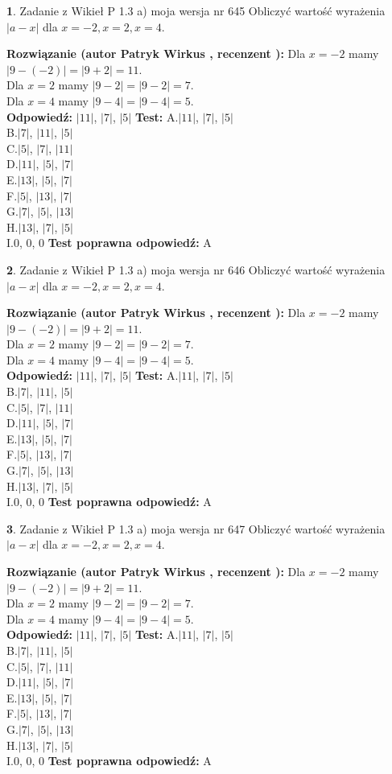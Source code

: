 \documentclass[12pt, a4paper]{article}
\theoremstyle{definition} %
\newtheorem{zad}{}
\newcommand{\zadStart}[1]{\begin{zad}#1\newline}
\newcommand{\zadStop}{\end{zad}}
\newcommand{\rozwStart}[2]{\noindent \textbf{Rozwiązanie (autor #1 , recenzent #2): }\newline}
\newcommand{\rozwStop}{\newline}
\newcommand{\odpStart}{\noindent \textbf{Odpowiedź:}\newline}
\newcommand{\odpStop}{\newline}
\newcommand{\testStart}{\noindent \textbf{Test:}\newline}
\newcommand{\testStop}{\newline}
\newcommand{\kluczStart}{\noindent \textbf{Test poprawna odpowiedź:}\newline}
\newcommand{\kluczStop}{\newline}
\begin{document}
\zadStart{Zadanie z Wikieł P 1.3 a) moja wersja nr 645}
Obliczyć wartość wyrażenia $|a - x|$ dla $x=-2,x=2,x=4$.
\zadStop
\rozwStart{Patryk Wirkus}{}
Dla $x = -2$ mamy $|9 - (-2)| = |9 + 2| = 11$.\\
Dla $x = 2$ mamy $|9 - 2| = |9 - 2| = 7$.\\
Dla $x = 4$ mamy $|9 - 4| = |9 - 4| = 5$.\\
\rozwStop
\odpStart
$|11|$, $|7|$, $|5|$
\odpStop
\testStart
A.$|11|$, $|7|$, $|5|$\\
B.$|7|$, $|11|$, $|5|$\\
C.$|5|$, $|7|$, $|11|$\\
D.$|11|$, $|5|$, $|7|$\\
E.$|13|$, $|5|$, $|7|$\\
F.$|5|$, $|13|$, $|7|$\\
G.$|7|$, $|5|$, $|13|$\\
H.$|13|$, $|7|$, $|5|$\\
I.$0$, $0$, $0$
\testStop
\kluczStart
A
\kluczStop



\zadStart{Zadanie z Wikieł P 1.3 a) moja wersja nr 646}
Obliczyć wartość wyrażenia $|a - x|$ dla $x=-2,x=2,x=4$.
\zadStop
\rozwStart{Patryk Wirkus}{}
Dla $x = -2$ mamy $|9 - (-2)| = |9 + 2| = 11$.\\
Dla $x = 2$ mamy $|9 - 2| = |9 - 2| = 7$.\\
Dla $x = 4$ mamy $|9 - 4| = |9 - 4| = 5$.\\
\rozwStop
\odpStart
$|11|$, $|7|$, $|5|$
\odpStop
\testStart
A.$|11|$, $|7|$, $|5|$\\
B.$|7|$, $|11|$, $|5|$\\
C.$|5|$, $|7|$, $|11|$\\
D.$|11|$, $|5|$, $|7|$\\
E.$|13|$, $|5|$, $|7|$\\
F.$|5|$, $|13|$, $|7|$\\
G.$|7|$, $|5|$, $|13|$\\
H.$|13|$, $|7|$, $|5|$\\
I.$0$, $0$, $0$
\testStop
\kluczStart
A
\kluczStop



\zadStart{Zadanie z Wikieł P 1.3 a) moja wersja nr 647}
Obliczyć wartość wyrażenia $|a - x|$ dla $x=-2,x=2,x=4$.
\zadStop
\rozwStart{Patryk Wirkus}{}
Dla $x = -2$ mamy $|9 - (-2)| = |9 + 2| = 11$.\\
Dla $x = 2$ mamy $|9 - 2| = |9 - 2| = 7$.\\
Dla $x = 4$ mamy $|9 - 4| = |9 - 4| = 5$.\\
\rozwStop
\odpStart
$|11|$, $|7|$, $|5|$
\odpStop
\testStart
A.$|11|$, $|7|$, $|5|$\\
B.$|7|$, $|11|$, $|5|$\\
C.$|5|$, $|7|$, $|11|$\\
D.$|11|$, $|5|$, $|7|$\\
E.$|13|$, $|5|$, $|7|$\\
F.$|5|$, $|13|$, $|7|$\\
G.$|7|$, $|5|$, $|13|$\\
H.$|13|$, $|7|$, $|5|$\\
I.$0$, $0$, $0$
\testStop
\kluczStart
A
\kluczStop
\end{document}
